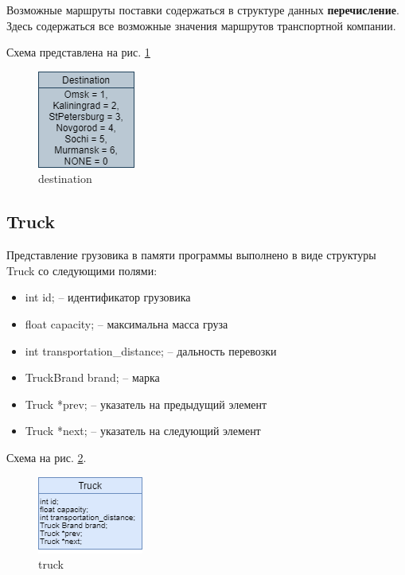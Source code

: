 Возможные маршруты поставки содержаться в структуре данных  \textbf{перечисление}.
Здесь содержаться все возможные значения маршрутов транспортной компании. 

Схема представлена на рис. \ref{destination}

\begin{figure}[hpt!]
    \centering
    \includegraphics[width=0.4\linewidth]{photo/data_structures/destination}
    \caption{destination}
    \label{destination}
\end{figure}

\subsection{Truck}

Представление грузовика в памяти программы выполнено в виде структуры Truck со следующими полями:

\begin{itemize}
    \item int id; -- идентификатор грузовика
    \item float capacity; -- максимальна масса груза
    \item int transportation\_distance; -- дальность перевозки
    \item TruckBrand brand; -- марка
    \item Truck *prev; -- указатель на предыдущий элемент
    \item Truck *next; -- указатель  на следующий элемент
\end{itemize}

Схема на рис. \ref{truck}.

\begin{figure}[H]
    \centering
    \includegraphics[width=0.4\linewidth]{photo/data_structures/truck}
    \caption{truck}
    \label{truck}
\end{figure}

